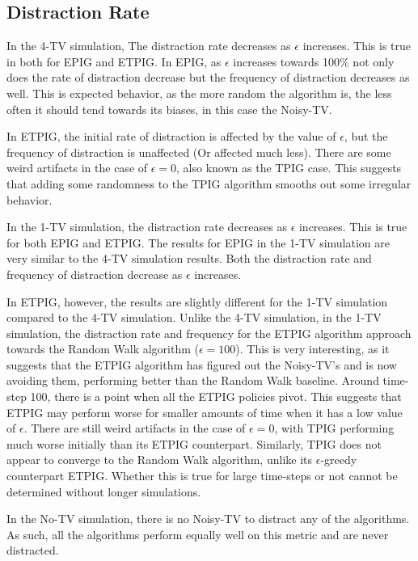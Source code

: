 \documentclass[12pt]{thesis}
\begin{document}
\subsection{Distraction Rate}
In the 4-TV simulation, The distraction rate decreases as $\epsilon$ increases. This is true in both for EPIG and ETPIG. In EPIG, as $\epsilon$ increases towards 100\% not only does the rate of distraction decrease but the frequency of distraction decreases as well. This is expected behavior, as the more random the algorithm is, the less often it should tend towards its biases, in this case the Noisy-TV.

In ETPIG, the initial rate of distraction is affected by the value of $\epsilon$, but the frequency of distraction is unaffected (Or affected much less). There are some weird artifacts in the case of $\epsilon = 0$, also known as the TPIG case. This suggests that adding some randomness to the TPIG algorithm smooths out some irregular behavior.

In the 1-TV simulation, the distraction rate decreases as $\epsilon$ increases. This is true for both EPIG and ETPIG. The results for EPIG in the 1-TV simulation are very similar to the 4-TV simulation results. Both the distraction rate and frequency of distraction decrease as $\epsilon$ increases.

In ETPIG, however, the results are slightly different for the 1-TV simulation compared to the 4-TV simulation. Unlike the 4-TV simulation, in the 1-TV simulation, the distraction rate and frequency for the ETPIG algorithm approach towards the Random Walk algorithm ($\epsilon = 100$). This is very interesting, as it suggests that the ETPIG algorithm has figured out the Noisy-TV's and is now avoiding them, performing better than the Random Walk baseline. Around time-step 100, there is a point when all the ETPIG policies pivot. This suggests that ETPIG may perform worse for smaller amounts of time when it has a low value of $\epsilon$. There are still weird artifacts in the case of $\epsilon = 0$, with TPIG performing much worse initially than its ETPIG counterpart. Similarly, TPIG does not appear to converge to the Random Walk algorithm, unlike its $\epsilon$-greedy counterpart ETPIG. Whether this is true for large time-steps or not cannot be determined without longer simulations. 

In the No-TV simulation, there is no Noisy-TV to distract any of the algorithms. As such, all the algorithms perform equally well on this metric and are never distracted.
\end{document}
